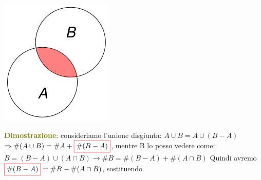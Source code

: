 \begin{itemize}[nosep]
    \begin{center}
        \begin{minipage}[t]{0.1\textwidth}
            \centering
            \includegraphics[width=\textwidth]{img/inc_escl_1}
        \end{minipage}
        \hfill
        \begin{minipage}[t]{0.8\textwidth}
            \begin{boxA}
                \textcolor{olive}{\textbf{Dimostrazione}}: consideriamo l'unione disgiunta: $A \cup B = A \cup (B - A)$ \\
                $\Rightarrow \# (A \cup B) = \# A + \fcolorbox{red}{white}{$\# (B - A)$}$, mentre B lo posso vedere come: \\
                $B = (B - A) \cup (A \cap B) \rightarrow \# B = \# (B - A) + \# (A \cap B)$ Quindi avremo \\
                $\fcolorbox{red}{white}{$\# (B - A)$} = \# B - \# (A \cap B)$, sostituendo 
                
                {\centering
                \par}
            \end{boxA}
        \end{minipage}
    \end{center}


\end{itemize}
